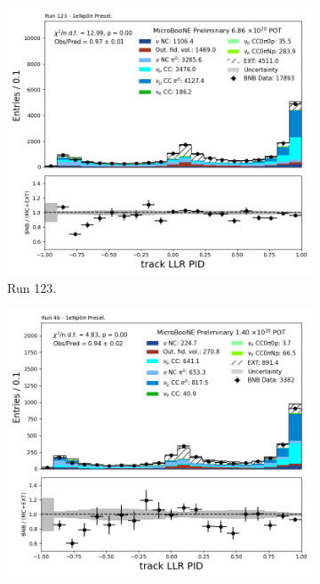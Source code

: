 \begin{figure}[H]
    \centering
    \begin{subfigure}[t]{0.32\linewidth}
        \includegraphics[width=\linewidth]{technote/Appendix_Preselection/Figures/1eNp0pi/Run123/trkpid_Run123_1eNp0pi_Presel.png}
        \caption{Run 123.}
    \end{subfigure}%
    \hspace{0.2cm}%
    \begin{subfigure}[t]{0.32\linewidth}
        \includegraphics[width=\linewidth]{technote/Appendix_Preselection/Figures/1eNp0pi/Run4b/trkpid_Run4b_1eNp0pi_Presel.png}

\end{subfigure}
\end{figure}
